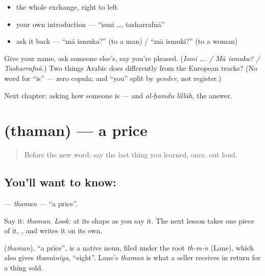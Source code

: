 \begin{itemize}
\raggedright
  \item the whole exchange, right to left
  \item your own introduction — \textquotedblleft{}ismī …, tasharrafnā\textquotedblright{}
  \item ask it back — \textquotedblleft{}mā ismuka?\textquotedblright{} (to a man) / \textquotedblleft{}mā ismuki?\textquotedblright{} (to a woman)
\end{itemize}

\begin{tcolorbox}[breakable,colback=teal!4,colframe=teal!35!black,title={Before you move on}]
Give your name, ask someone else's, say you're pleased. (\emph{Ismī …. / Mā ismuka? / Tasharrafnā.}) Two things Arabic does differently from the European tracks? (No word for \textquotedblleft{}is\textquotedblright{} — zero copula; and \textquotedblleft{}you\textquotedblright{} split by \emph{gender}, not register.)

Next chapter: asking how someone is — and \emph{al-ḥamdu lillāh}, the answer.
\end{tcolorbox}
\section[\texorpdfstring{\ar{ثمن} (thaman)}{ثمن (thaman)}]{ (thaman) — a price}

\label{lesson:AR-C02-thaman}



\begin{quote}
Before the new word: say the last thing you learned, once, out loud.
\end{quote}

\subsection*{You'll want to know: }
\textbf{} — \emph{thaman} — \textquotedblleft{}a price\textquotedblright{}.

Say it: \emph{thaman}. \emph{Look:} at its shape as you say it. The next lesson takes one piece of it, \textbf{  }, and writes it on its own.

\begin{cousinweb}
\textbf{} (\emph{thaman}), \textquotedblleft{}a price\textquotedblright{}, is a native noun, filed under the root \emph{th-m-n} (Lane), which also gives \emph{thamāniya}, \textquotedblleft{}eight\textquotedblright{}. Lane's \emph{thaman} is what a seller receives in return for a thing sold.
\end{cousinweb}

